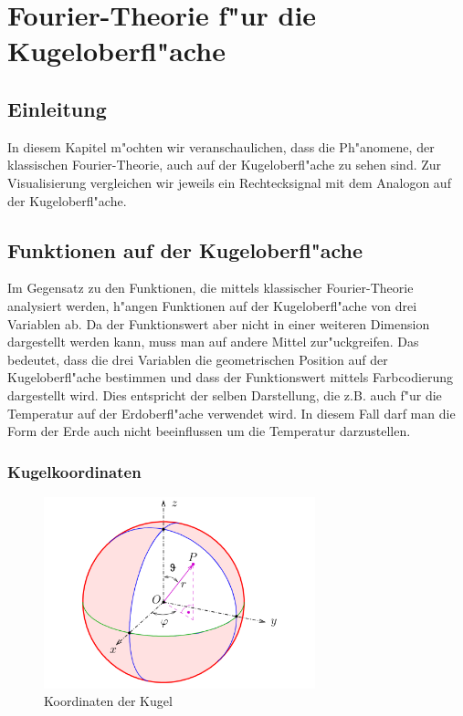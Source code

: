 \chapter{Fourier-Theorie f"ur die Kugeloberfl"ache
\label{chapter:kugel}}
\begin{refsection}

\section{Einleitung}
In diesem Kapitel m"ochten wir veranschaulichen, dass die Ph"anomene, 
der klassischen Fourier-Theorie, auch auf der Kugeloberfl"ache zu 
sehen sind.
Zur Visualisierung vergleichen wir jeweils ein Rechtecksignal mit 
dem Analogon auf der Kugeloberfl"ache.

\section{Funktionen auf der Kugeloberfl"ache}
Im Gegensatz zu den Funktionen, die mittels klassischer 
Fourier-Theorie analysiert werden, h"angen Funktionen auf der 
Kugeloberfl"ache von drei Variablen ab. 
Da der Funktionswert aber nicht in einer weiteren Dimension 
dargestellt werden kann, muss man auf andere Mittel zur"uckgreifen. 
Das bedeutet, dass die drei Variablen die geometrischen Position
auf der Kugeloberfl"ache bestimmen und dass der Funktionswert 
mittels Farbcodierung dargestellt wird. 
Dies entspricht der selben Darstellung, die z.B. auch f"ur die 
Temperatur auf der Erdoberfl"ache verwendet wird. In diesem Fall 
darf man die Form der Erde auch nicht beeinflussen um die Temperatur 
darzustellen.
\subsection{Kugelkoordinaten}
\begin{figure}%
\centering
\includegraphics[width=0.7\textwidth]{kugel/Kugelkoord.pdf}
\caption{Koordinaten der Kugel
\label{skript:Koordinaten der Kugel}}
\end{figure}


\end{refsection}
